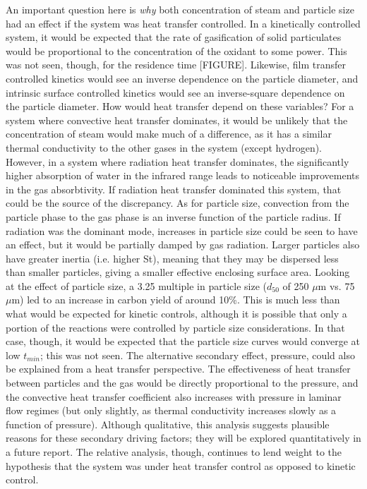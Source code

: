\documentclass[11pt,twocolumn]{article}
\begin{document}
An important question here is \emph{why} both concentration of steam and particle size had an effect if the system was heat transfer controlled.  In a kinetically controlled system, it would be expected that the rate of gasification of solid particulates would be proportional to the concentration of the oxidant to some power.  This was not seen, though, for the residence time [FIGURE].  Likewise, film transfer controlled kinetics would see an inverse dependence on the particle diameter, and intrinsic surface controlled kinetics would see an inverse-square dependence on the particle diameter.  How would heat transfer depend on these variables?  For a system where convective heat transfer dominates, it would be unlikely that the concentration of steam would make much of a difference, as it has a similar thermal conductivity to the other gases in the system (except hydrogen).  However, in a system where radiation heat transfer dominates, the significantly higher absorption of water in the infrared range leads to noticeable improvements in the gas absorbtivity.  If radiation heat transfer dominated this system, that could be the source of the discrepancy.  As for particle size, convection from the particle phase to the gas phase is an inverse function of the particle radius.  If radiation was the dominant mode, increases in particle size could be seen to have an effect, but it would be partially damped by gas radiation.  Larger particles also have greater inertia (i.e. higher St), meaning that they may be dispersed less than smaller particles, giving a smaller effective enclosing surface area.  Looking at the effect of particle size, a 3.25 multiple in particle size ($d_{50}$ of 250 $\mu$m vs. 75 $\mu$m) led to an increase in carbon yield of around 10\%.  This is much less than what would be expected for kinetic controls, although it is possible that only a portion of the reactions were controlled by particle size considerations.  In that case, though, it would be expected that the particle size curves would converge at low $t_{min}$; this was not seen.  The alternative secondary effect, pressure, could also be explained from a heat transfer perspective.  The effectiveness of heat transfer between particles and the gas would be directly proportional to the pressure, and the convective heat transfer coefficient also increases with pressure in laminar flow regimes (but only slightly, as thermal conductivity increases slowly as a function of pressure).  Although qualitative, this analysis suggests plausible reasons for these secondary driving factors; they will be explored quantitatively in a future report.  The relative analysis, though, continues to lend weight to the hypothesis that the system was under heat transfer control as opposed to kinetic control.
\end{document}
